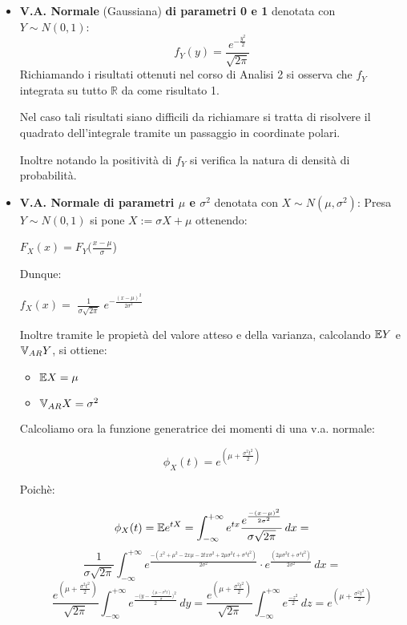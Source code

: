 \begin{itemize}
    \item \textbf{V.A. Normale} (Gaussiana) \textbf{di parametri 0 e 1} denotata con
    \newline
    $Y\sim N(0,1)$:\[ f_Y(y)={ \frac{e^{-\frac{y^2}{2}}}{\sqrt{2\pi}}} \]
Richiamando i risultati ottenuti nel corso di Analisi 2 si osserva che $f_Y$ integrata su tutto $\mathbb{R}$ da come risultato 1. 

Nel caso tali risultati siano difficili da richiamare si tratta di risolvere il quadrato dell'integrale tramite un passaggio in coordinate polari.

Inoltre notando la positività di $f_Y$ si verifica la natura di densità di probabilità.
    
    \vspace{10px}
    \item \textbf{V.A. Normale di parametri $\mu$ e $\sigma^2$} denotata con $X\sim N(\mu,\sigma^2)$:
    \vspace{5px}
    \newline
    Presa $Y\sim N(0,1)$ si pone $X:=\sigma X + \mu$ ottenendo:
    \begin{center}
    $F_X(x)=F_Y\big(${\large $\frac{x-\mu}{\sigma}$}\big)    
    \end{center}
    Dunque: 
    \begin{center}
        $f_X(x) =$ {\Large $\frac{1}{\sigma\sqrt{2\pi}}$ {\Large $e^{-\frac{(x-\mu)^2}{2\sigma^2}}$ } } 
    \end{center}
    Inoltre tramite le propietà del valore atteso e della varianza, calcolando $\mathbb{E} Y$ e $\mathbb{V}_{AR} Y$, si ottiene:
    \begin{itemize}
        \item $\mathbb{E} X = \mu$
        \item $\mathbb{V}_{AR} X = \sigma^2$
    \end{itemize}
    
    
    \newcommand{\intt}{\int_{-\infty}^{+\infty}}
    
    Calcoliamo ora la funzione generatrice dei momenti di una v.a. normale:
    
    \[\phi_X(t) = e^{(\mu+\frac{\sigma^2t^2}{2})}\]
    
    Poichè:
    
    \[\phi_X(t)=\E e^{tX}=\int_{-\infty}^{+\infty}e^{tx} \frac{{\Huge e^ \frac{-(x-\mu)^2}{2\sigma^2}}}{\sigma \sqrt{2\pi}}  \,dx =\]
    \[ \frac{1}{\sigma\sqrt{2\pi}}\intt e^{\frac{-(x^2+\mu^2-2x\mu-2tx\sigma^2+2\mu\sigma^2t+\sigma^4t^2)}{2\sigma^2}} \cdot e^{\frac{(2\mu\sigma^2t+\sigma^4t^2)}{2\sigma^2}} \,dx =\]
    \[\frac{e^{(\mu+\frac{\sigma^2t^2}{2})}}{\sqrt{2\pi}} \intt e^{\frac{-\big(y-\frac{(\mu-\sigma^2t)}{\sigma}\big)^2}{2}} \,dy = \frac{e^{(\mu+\frac{\sigma^2t^2}{2})}}{\sqrt{2\pi}} \intt e^{\frac{-z^2}{2}} \,dz = e^{(\mu+\frac{\sigma^2t^2}{2})} \] 
    

\end{itemize}
